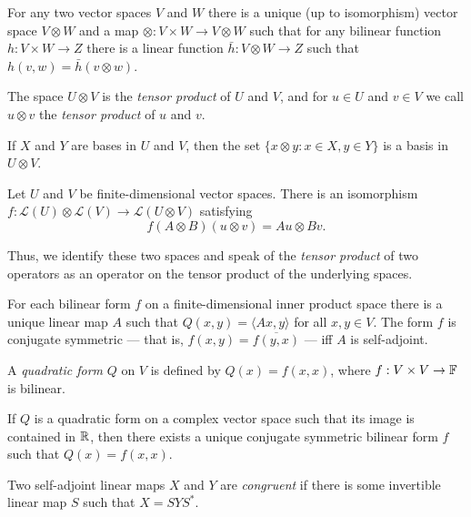 \begin{prop}
    For any two vector spaces $V$ and $W$ there is a unique (up to isomorphism)
    vector space $V\otimes W$ and a map $\otimes:V\times W\to V\otimes W$
    such that for any bilinear function $h:V\times W\to Z$ there is a linear
    function $\bar h:V\otimes W\to Z$ such that $h(v,w)=\bar h(v\otimes w)$.
\end{prop}
\begin{defn}
    The space $U\otimes V$ is the \emph{tensor product} of $U$ and $V$, and for
    $u\in U$ and $v\in V$ we call $u\otimes v$ the \emph{tensor product} of $u$
    and $v$.
\end{defn}
\begin{prop}
    If $X$ and $Y$ are bases in $U$ and $V$, then the set $\{x\otimes y:x\in
    X,y\in Y\}$ is a basis in $U\otimes V$.
\end{prop}
\begin{prop}
    Let $U$ and $V$ be finite-dimensional vector spaces.
    There is an isomorphism $f:\mathcal
    L(U)\otimes\mathcal L(V)\to\mathcal L(U\otimes V)$ satisfying
    \[f(A\otimes B)(u\otimes v)=Au\otimes Bv.\]
\end{prop}
\begin{defn}
    Thus, we identify these two spaces and speak of the \emph{tensor product} of
    two operators as an operator on the tensor product of the underlying spaces.
\end{defn}
\begin{prop}
  For each bilinear form $f$ on a finite-dimensional inner product space
  there is a unique linear map $A$
  such that $Q(x,y)=\langle Ax,y\rangle$ for all $x,y\in V$. The form $f$ is
  conjugate symmetric --- that is, $f(x,y)=\overline{f(y,x)}$ --- iff $A$ is
  self-adjoint.
\end{prop}
\begin{defn}
  A \emph{quadratic form} $Q$ on $V$ is defined by $Q(x)=f(x,x)$, where
  $f:V\times V\to\mathbb{F}$ is bilinear.
\end{defn}
\begin{prop}
  If $Q$ is a quadratic form on a complex vector space such that its image is
  contained in $\mathbb{R}$, then there exists a unique conjugate symmetric bilinear
  form $f$ such that $Q(x)=f(x,x)$.
\end{prop}
\begin{defn}
  Two self-adjoint linear maps $X$ and $Y$ are \emph{congruent} if there is some
  invertible linear map $S$ such that $X=SYS^*$.
\end{defn}
